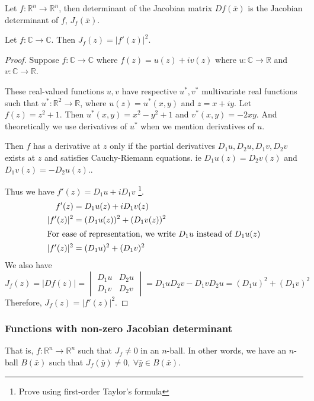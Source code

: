 \begin{definition}
Let $f : \mathbb{R}^n \to \mathbb{R}^n$, then determinant of the Jacobian matrix $Df(\bar{x})$ is the Jacobian determinant of $f$, $J_f(\bar{x})$.
\end{definition}

\begin{theorem}
Let $f : \mathbb{C} \to \mathbb{C}$.
Then $J_f(z) = |f'(z)|^2$.
\end{theorem}
\begin{proof}
Suppose $f : \mathbb{C} \to \mathbb{C}$ where $f(z) = u(z) + iv(z)$ where $u : \mathbb{C} \to \mathbb{R}$ and $v : \mathbb{C} \to \mathbb{R}$.
\begin{commentary}These real-valued functions $u,v$ have respective $u^*,v^*$ multivariate real functions such that $u^* : \mathbb{R}^2 \to \mathbb{R}$, where $u(z) = u^*(x,y)$ and $z = x+iy$.
Let $f(z) = z^2+1$.
Then $u^*(x,y) = x^2-y^2+1$ and $v^*(x,y) = -2xy$.
And theoretically we use derivatives of $u^*$ when we mention derivatives of $u$.\end{commentary}

Then $f$ has a derivative at $z$ only if the partial derivatives $D_1u,D_2u,D_1v,D_2v$ exists at $z$ and satisfies Cauchy-Riemann equations.
ie $D_1u(z) = D_2v(z)$ and $D_1v(z) = -D_2u(z)$.\cite[Theorem 5.22]{apostol}.

Thus we have $f'(z) = D_1u + iD_1v$ \cite[Theorem 12.6]{apostol}\footnote{Prove using first-order Taylor's formula}.
\begin{align*}
	f'(z) & = D_1u(z) + iD_1v(z) \\
	|f'(z)|^2 & = (D_1u(z))^2 + (D_1v(z))^2\\
	\intertext{For ease of representation, we write $D_1u$ instead of $D_1u(z)$}
	|f'(z)|^2 & = (D_1u)^2 + (D_1v)^2
\end{align*}
We also have
\[ J_f(z) = |Df(z)| = \begin{vmatrix} D_1u & D_2u \\ D_1v & D_2v \end{vmatrix} = D_1uD_2v - D_1vD_2u = (D_1u)^2 + (D_1v)^2 \]
Therefore, $J_f(z) = |f'(z)|^2$.
\end{proof}

\subsubsection{Functions with non-zero Jacobian determinant}
\begin{commentary}
That is, $f : \mathbb{R}^n \to \mathbb{R}^n$ such that $J_f \ne 0$ in an $n$-ball. In other words, we have an $n$-ball $B(\bar{x})$ such that $J_f(\bar{y}) \ne 0,\ \forall \bar{y} \in B(\bar{x})$.
\end{commentary}

